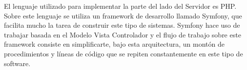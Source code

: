 El lenguaje utilizado para implementar la parte del lado del Servidor es PHP. Sobre este lenguaje se utiliza un framework de desarrollo llamado Symfony, que facilita mucho la tarea de construir este tipo de sistemas. Symfony hace uso de trabajar basada en el Modelo Vista Controlador y el flujo de trabajo sobre este framework consiste en simplificarte, bajo esta arquitectura, un montón de procedimientos y líneas de código que se repiten constantemente en este tipo de software.

